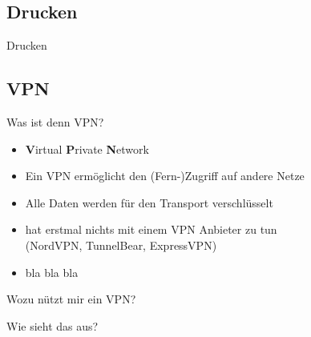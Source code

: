 \subsection{Drucken}
\begin{frame}{Drucken}
\end{frame}


\subsection{VPN}
\begin{frame}{Was ist denn VPN?}
    \large
    \begin{itemize}
        \item \textbf{V}irtual \textbf{P}rivate \textbf{N}etwork
        \item Ein VPN ermöglicht den (Fern-)Zugriff auf andere Netze
        \item Alle Daten werden für den Transport verschlüsselt
        \item hat erstmal nichts mit einem VPN Anbieter zu tun \\
              (NordVPN, TunnelBear, ExpressVPN)
        \item bla bla bla
    \end{itemize}
\end{frame}

\begin{frame}{Wozu nützt mir ein VPN?}
\end{frame}

\begin{frame}{Wie sieht das aus?}
    \begin{center}
    \end{center}
\end{frame}

